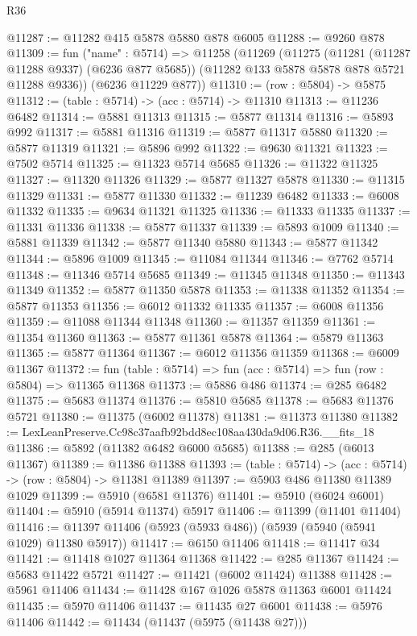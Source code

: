 \begin{lexlean}{R36}
\begin{coremodule}
@11287 := @11282 @415 @5878 @5880 @878 @6005
@11288 := @9260 @878
@11309 := fun ("name" : @5714) =>
  @11258
    (@11269
      (@11275
        (@11281 (@11287 @11288 @9337) (@6236 @877 @5685))
        (@11282 @133 @5878 @5878 @878 @5721 @11288 @9336))
      (@6236 @11229 @877))
@11310 := (row : @5804) -> @5875
@11312 := (table : @5714) -> (acc : @5714) -> @11310
@11313 := @11236 @6482
@11314 := @5881 @11313
@11315 := @5877 @11314
@11316 := @5893 @992
@11317 := @5881 @11316
@11319 := @5877 @11317 @5880
@11320 := @5877 @11319
@11321 := @5896 @992
@11322 := @9630 @11321
@11323 := @7502 @5714
@11325 := @11323 @5714 @5685
@11326 := @11322 @11325
@11327 := @11320 @11326
@11329 := @5877 @11327 @5878
@11330 := @11315 @11329
@11331 := @5877 @11330
@11332 := @11239 @6482
@11333 := @6008 @11332
@11335 := @9634 @11321 @11325
@11336 := @11333 @11335
@11337 := @11331 @11336
@11338 := @5877 @11337
@11339 := @5893 @1009
@11340 := @5881 @11339
@11342 := @5877 @11340 @5880
@11343 := @5877 @11342
@11344 := @5896 @1009
@11345 := @11084 @11344
@11346 := @7762 @5714
@11348 := @11346 @5714 @5685
@11349 := @11345 @11348
@11350 := @11343 @11349
@11352 := @5877 @11350 @5878
@11353 := @11338 @11352
@11354 := @5877 @11353
@11356 := @6012 @11332 @11335
@11357 := @6008 @11356
@11359 := @11088 @11344 @11348
@11360 := @11357 @11359
@11361 := @11354 @11360
@11363 := @5877 @11361 @5878
@11364 := @5879 @11363
@11365 := @5877 @11364
@11367 := @6012 @11356 @11359
@11368 := @6009 @11367
@11372 := fun (table : @5714) => fun (acc : @5714) => fun (row : @5804) => @11365 @11368
@11373 := @5886 @486
@11374 := @285 @6482
@11375 := @5683 @11374
@11376 := @5810 @5685
@11378 := @5683 @11376 @5721
@11380 := @11375 (@6002 @11378)
@11381 := @11373 @11380
@11382 := LexLeanPreserve.Cc98c37aafb92bdd8ec108aa430da9d06.R36.__fits_18
@11386 := @5892 (@11382 @6482 @6000 @5685)
@11388 := @285 (@6013 @11367)
@11389 := @11386 @11388
@11393 := (table : @5714) -> (acc : @5714) -> (row : @5804) -> @11381 @11389
@11397 := @5903 @486 @11380 @11389 @1029
@11399 := @5910 (@6581 @11376)
@11401 := @5910 (@6024 @6001)
@11404 := @5910 (@5914 @11374) @5917
@11406 := @11399 (@11401 @11404)
@11416 := @11397 @11406 (@5923 (@5933 @486)) (@5939 (@5940 (@5941 @1029) @11380 @5917))
@11417 := @6150 @11406
@11418 := @11417 @34
@11421 := @11418 @1027 @11364 @11368
@11422 := @285 @11367
@11424 := @5683 @11422 @5721
@11427 := @11421 (@6002 @11424) @11388
@11428 := @5961 @11406
@11434 := @11428 @167 @1026 @5878 @11363 @6001 @11424
@11435 := @5970 @11406
@11437 := @11435 @27 @6001
@11438 := @5976 @11406
@11442 := @11434 (@11437 (@5975 (@11438 @27)))

\end{coremodule}
\end{lexlean}
